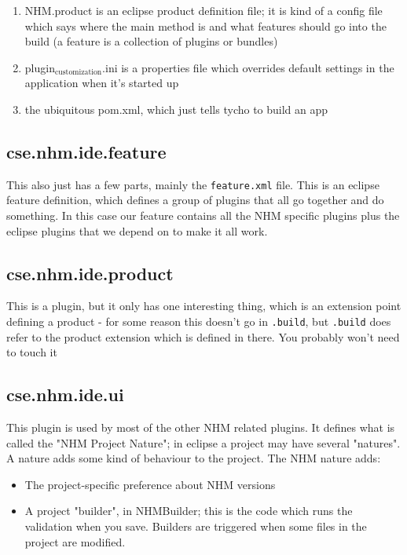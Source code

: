 \documentclass[11pt]{article}
\begin{document}
\begin{enumerate}
\item NHM.product is an eclipse product definition file; it is kind of a config file which says where the main method is and what features should go into the build (a feature is a collection of plugins or bundles)
\item plugin$_{\text{customization}}$.ini is a properties file which overrides default settings in the application when it's started up
\item the ubiquitous pom.xml, which just tells tycho to build an app
\end{enumerate}

\subsection{cse.nhm.ide.feature}
\label{sec-1-2}

This also just has a few parts, mainly the \texttt{feature.xml} file. This is an eclipse feature definition, which defines a group of plugins that all go together and do something. In this case our feature contains all the NHM specific plugins plus the eclipse plugins that we depend on to make it all work.

\subsection{cse.nhm.ide.product}
\label{sec-1-3}

This is a plugin, but it only has one interesting thing, which is an extension point defining a product - for some reason this doesn't go in \texttt{.build}, but \texttt{.build} does refer to the product extension which is defined in there. You probably won't need to touch it

\subsection{cse.nhm.ide.ui}
\label{sec-1-4}

This plugin is used by most of the other NHM related plugins. It defines what is called the "NHM Project Nature"; in eclipse a project may have several "natures". A nature adds some kind of behaviour to the project. The NHM nature adds:

\begin{itemize}
\item The project-specific preference about NHM versions
\item A project "builder", in NHMBuilder; this is the code which runs the validation when you save. Builders are triggered when some files in the project are modified.
\end{itemize}
\end{document}
